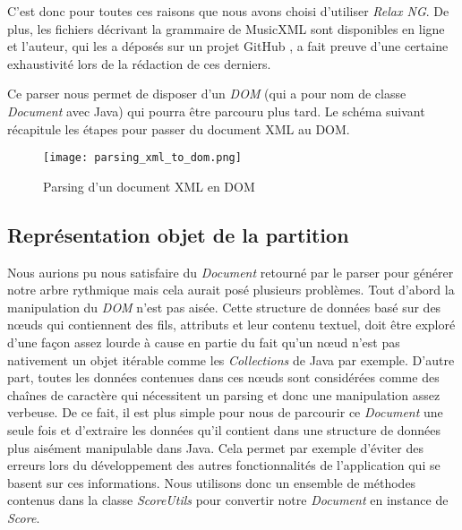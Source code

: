 \par
C'est donc pour toutes ces raisons que nous avons choisi d'utiliser \emph{Relax NG}. De plus, les fichiers décrivant la grammaire de MusicXML sont disponibles en ligne et l'auteur, qui les a déposés sur un projet GitHub \cite{relaxng_for_musicxml}, a fait preuve d'une certaine exhaustivité lors de la rédaction de ces derniers.

\par
Ce parser nous permet de disposer d'un \emph{DOM} (qui a pour nom de classe \emph{Document} avec Java) qui pourra être parcouru plus tard. Le schéma suivant récapitule les étapes pour passer du document XML au DOM.


\begin{figure}[!h]
\centering
\texttt{[image: parsing\_xml\_to\_dom.png]}\\[1cm]
\caption{Parsing d'un document XML en DOM}
\label{Parsing d'un document XML en DOM}
\end{figure}


\subsection{Représentation objet de la partition}

\par
Nous aurions pu nous satisfaire du \emph{Document} retourné par le parser pour générer notre arbre rythmique mais cela aurait posé plusieurs problèmes. Tout d'abord la manipulation du \emph{DOM} n'est pas aisée. Cette structure de données basé sur des nœuds qui contiennent des fils, attributs et leur contenu textuel, doit être exploré d'une façon assez lourde à cause en partie du fait qu'un nœud n'est pas nativement un objet itérable comme les \emph{Collections} de Java par exemple. D'autre part, toutes les données contenues dans ces nœuds sont considérées comme des chaînes de caractère qui nécessitent un parsing et donc une manipulation assez verbeuse. De ce fait, il est plus simple pour nous de parcourir ce \emph{Document} une seule fois et d'extraire les données qu'il contient dans une structure de données plus aisément manipulable dans Java. Cela permet par exemple d'éviter des erreurs lors du développement des autres fonctionnalités de l'application qui se basent sur ces informations. Nous utilisons donc un ensemble de méthodes contenus dans la classe \emph{ScoreUtils} pour convertir notre \emph{Document} en instance de \emph{Score}.

